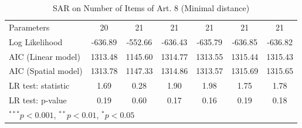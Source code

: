 \begin{table}[!h]
\begin{center}
\begin{tabular}{l c c c c c c }
Parameters              & 20           & 21           & 21           & 21           & 21           & 21           \\
Log Likelihood          & -636.89      & -552.66      & -636.43      & -635.79      & -636.85      & -636.82      \\
AIC (Linear model)      & 1313.48      & 1145.60      & 1314.77      & 1313.55      & 1315.44      & 1315.43      \\
AIC (Spatial model)     & 1313.78      & 1147.33      & 1314.86      & 1313.57      & 1315.69      & 1315.65      \\
LR test: statistic      & 1.69         & 0.28         & 1.90         & 1.98         & 1.75         & 1.78         \\
LR test: p-value        & 0.19         & 0.60         & 0.17         & 0.16         & 0.19         & 0.18         \\
\bottomrule
\multicolumn{7}{l}{\scriptsize{$^{***}p<0.001$, $^{**}p<0.01$, $^*p<0.05$}}
\end{tabular}
\caption{SAR on Number of Items of Art. 8 (Minimal distance)}
\label{table:coefficients}
\end{center}
\end{table}
